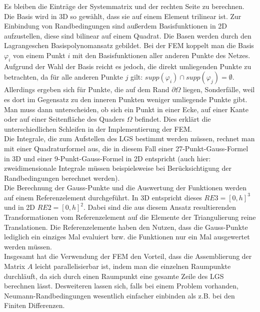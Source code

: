 Es bleiben die Einträge der Systemmatrix und der rechten Seite zu berechnen. 
Die Basis  wird in 3D so gewählt, dass sie auf einem Element trilinear ist. Zur Einbindung von Randbedingungen sind außerdem Basisfunktionen in 2D aufzustellen, diese sind bilinear auf einem Quadrat. Die Basen werden durch den Lagrangeschen Basispolynomansatz gebildet. Bei der FEM koppelt man die Basis $\varphi_i$ von einem Punkt $i$ mit den Basisfunktionen aller anderen Punkte des Netzes. Aufgrund der Wahl der Basis reicht es jedoch, die direkt umliegenden Punkte zu betrachten, da für alle anderen Punkte $j$ gilt: $supp(\varphi_i) \cap supp(\varphi_j) = \emptyset$. Allerdings ergeben sich für Punkte, die auf dem Rand $\partial \Omega$ liegen, Sonderfälle, weil es dort im Gegensatz zu den inneren Punkten weniger umliegende Punkte gibt. Man muss dann unterscheiden, ob sich ein Punkt in einer Ecke, auf einer Kante oder auf einer Seitenfläche des Quaders $\Omega$ befindet. Dies erklärt die unterschiedlichen Schleifen in der Implementierung der FEM. \\
Die Integrale, die zum Aufstellen des LGS bestimmt werden müssen, rechnet man mit einer Quadraturformel aus, die in diesem Fall einer 27-Punkt-Gauss-Formel in 3D und einer 9-Punkt-Gauss-Formel in 2D entspricht (auch hier: zweidimensionale Integrale müssen beispielsweise bei Berücksichtigung der Randbedingungen berechnet werden). \\
Die Berechnung der Gauss-Punkte und die Auswertung der Funktionen werden auf einem Referenzelement durchgeführt. In 3D entspricht dieses $RE3=[0,h]^3$ und in 2D $RE2=[0,h]^2$. Dabei sind die aus diesem Ansatz resultierenden Transformationen vom Referenzelement auf die Elemente der Triangulierung reine Translationen. Die Referenz\-elemente haben den Nutzen, dass die Gauss-Punkte lediglich ein einziges Mal evaluiert bzw. die Funktionen nur ein Mal ausgewertet werden müssen.   \\

Insgesamt hat die Verwendung der FEM den Vorteil, dass die Assemblierung der Matrix $A$ leicht parallelisierbar ist, indem man die einzelnen Raumpunkte durchläuft, da sich durch einen Raumpunkt eine gesamte Zeile des LGS berechnen lässt. Desweiteren lassen sich, falls bei einem Problem vorhanden, Neumann-Randbedingungen wesentlich einfacher einbinden als z.B. bei den Finiten Differenzen. 


